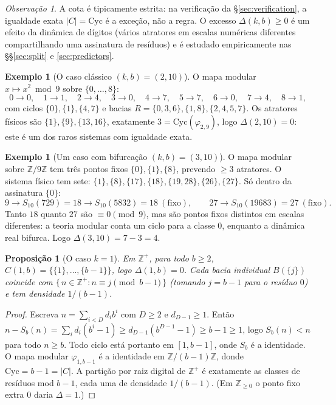 \documentclass[11pt]{article}
\newtheorem{proposition}[theorem]{Proposição}
\theoremstyle{definition}
\newtheorem{example}[theorem]{Exemplo}
\theoremstyle{remark}
\newtheorem{remark}[theorem]{Observação}
\newcommand{\Cyc}{\mathrm{Cyc}}
\begin{document}
\begin{remark}
A cota é tipicamente estrita: na verificação da \S\ref{sec:verification}, a igualdade exata $|C| = \Cyc$ é a exceção, não a regra. O excesso $\Delta(k,b) \ge 0$ é um efeito da dinâmica de dígitos (vários atratores em escalas numéricas diferentes compartilhando uma assinatura de resíduos) e é estudado empiricamente nas \S\S\ref{sec:split} e \ref{sec:predictors}.
\end{remark}

\begin{example}[O caso clássico $(k,b) = (2,10)$]\label{ex:classic}
O mapa modular $x \mapsto x^2 \bmod 9$ sobre $\{0,\dots,8\}$:
\[
0\to 0,\quad 1\to 1,\quad 2\to 4,\quad 3\to 0,\quad 4\to 7,\quad 5\to 7,\quad 6\to 0,\quad 7\to 4,\quad 8\to 1,
\]
com ciclos $\{0\},\{1\},\{4,7\}$ e bacias $R = \{0,3,6\},\{1,8\},\{2,4,5,7\}$. Os atratores físicos são $\{1\},\{9\},\{13,16\}$, exatamente $3 = \Cyc(\varphi_{2,9})$, logo $\Delta(2,10) = 0$: este é um dos raros sistemas com igualdade exata.
\end{example}

\begin{example}[Um caso com bifurcação $(k,b) = (3,10)$]\label{ex:bif}
O mapa modular sobre $\mathbb{Z}/9\mathbb{Z}$ tem três pontos fixos $\{0\},\{1\},\{8\}$, prevendo $\ge 3$ atratores. O sistema físico tem sete: $\{1\},\{8\},\{17\},\{18\},\{19,28\},\{26\},\{27\}$. Só dentro da assinatura $\{0\}$:
\[
9 \to S_{10}(729) = 18 \to S_{10}(5832) = 18 \ (\text{fixo}), \qquad 27 \to S_{10}(19683) = 27 \ (\text{fixo}).
\]
Tanto $18$ quanto $27$ são $\equiv 0 \pmod 9$, mas são pontos fixos distintos em escalas diferentes: a teoria modular conta um ciclo para a classe $0$, enquanto a dinâmica real bifurca. Logo $\Delta(3,10) = 7 - 3 = 4$.
\end{example}

\begin{proposition}[O caso $k=1$]\label{prop:k1}
Em $\mathbb{Z}^+$, para todo $b\ge 2$, $C(1,b)=\{\{1\},\dots,\{b-1\}\}$, logo $\Delta(1,b)=0$. Cada bacia individual $B(\{j\})$ coincide com $\{\,n\in\mathbb{Z}^+: n\equiv j\pmod{b-1}\,\}$ (tomando $j=b-1$ para o resíduo $0$) e tem densidade $1/(b-1)$.
\end{proposition}

\begin{proof}
Escreva $n=\sum_{i<D} d_i b^i$ com $D\ge 2$ e $d_{D-1}\ge 1$. Então $n-S_b(n)=\sum_i d_i(b^i-1)\ge d_{D-1}(b^{D-1}-1)\ge b-1\ge 1$, logo $S_b(n)<n$ para todo $n\ge b$. Todo ciclo está portanto em $[1,b-1]$, onde $S_b$ é a identidade. O mapa modular $\varphi_{1,b-1}$ é a identidade em $\mathbb{Z}/(b-1)\mathbb{Z}$, donde $\Cyc=b-1=|C|$. A partição por raiz digital de $\mathbb{Z}^+$ é exatamente as classes de resíduos mod $b-1$, cada uma de densidade $1/(b-1)$. (Em $\mathbb{Z}_{\ge 0}$ o ponto fixo extra $0$ daria $\Delta=1$.)
\end{proof}
\end{document}
